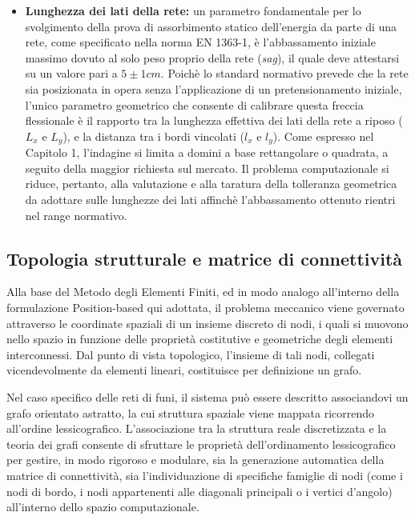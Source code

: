 \begin{itemize}
   \item \textbf{Lunghezza dei lati della rete:} un parametro fondamentale per lo svolgimento della prova di assorbimento statico dell'energia da parte di una rete, come specificato nella norma EN 1363-1\cite{EN1263-1}, è l'abbassamento iniziale massimo dovuto al solo peso proprio della rete (\textit{sag}), il quale deve attestarsi su un valore pari a $5 \pm 1 cm$. Poichè lo standard normativo prevede che la rete sia posizionata in opera senza l'applicazione di un pretensionamento iniziale, l'unico parametro geometrico che consente di calibrare questa freccia flessionale è il rapporto tra la lunghezza effettiva dei lati della rete a riposo ($L_x$ e $L_y$), e la distanza tra i bordi vincolati ($l_x$ e $l_y$). Come espresso nel Capitolo 1, l'indagine si limita a domini a base rettangolare o quadrata, a seguito della maggior richiesta sul mercato. Il problema computazionale si riduce, pertanto, alla valutazione e alla taratura della tolleranza geometrica da adottare sulle lunghezze dei lati affinchè l'abbassamento ottenuto rientri nel range normativo.    
\end{itemize}

\subsection{Topologia strutturale e matrice di connettività}
\label{sec:connettività}
Alla base del Metodo degli Elementi Finiti, ed in modo analogo all'interno della formulazione Position-based qui adottata, il problema meccanico viene governato attraverso le coordinate spaziali di un insieme discreto di nodi, i quali si muovono nello spazio in funzione delle proprietà costitutive e geometriche degli elementi interconnessi. Dal punto di vista topologico, l'insieme di tali nodi, collegati vicendevolmente da elementi lineari, costituisce per definizione un grafo. 

Nel caso specifico delle reti di funi, il sistema può essere descritto associandovi un grafo orientato astratto, la cui struttura spaziale viene mappata ricorrendo all'ordine lessicografico. L'associazione tra la struttura reale discretizzata e la teoria dei grafi consente di sfruttare le proprietà dell'ordinamento lessicografico per gestire, in modo rigoroso e modulare, sia la generazione automatica della matrice di connettività, sia l'individuazione di specifiche famiglie di nodi (come i nodi di bordo, i nodi appartenenti alle diagonali principali o i vertici d'angolo) all'interno dello spazio computazionale.

